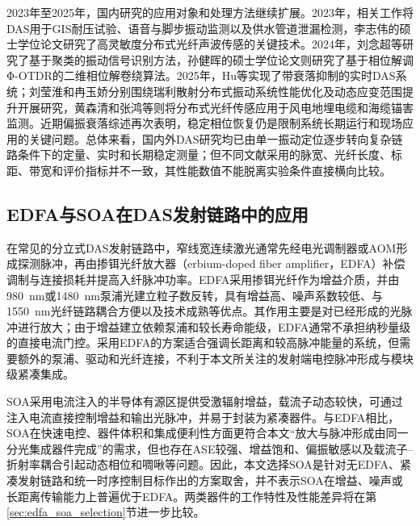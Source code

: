 2023年至2025年，国内研究的应用对象和处理方法继续扩展。2023年，相关工作将DAS用于GIS耐压试验、语音与脚步振动监测以及供水管道泄漏检测\cite{huang2023gis_cn,sun2023voice_cn,zhang2023pipeline_thesis}，李志伟的硕士学位论文研究了高灵敏度分布式光纤声波传感的关键技术\cite{li2023highsensitivity_thesis}。2024年，刘念超等研究了基于聚类的振动信号识别方法\cite{liu2024clustering_cn}，孙健晖的硕士学位论文则研究了基于相位解调Φ-OTDR的二维相位解卷绕算法\cite{sun2024unwrapping_thesis}。2025年，Hu等实现了带衰落抑制的实时DAS系统\cite{hu2025realtime}；刘莹淮和冉玉娇分别围绕瑞利散射分布式振动系统性能优化及动态应变范围提升开展研究\cite{liu2025rayleigh_thesis,ran2025dynamic_thesis}，黄森清和张鸿等则将分布式光纤传感应用于风电地埋电缆和海缆锚害监测\cite{huang2025cable_thesis,zhang2025submarine_cn}。近期偏振衰落综述再次表明，稳定相位恢复仍是限制系统长期运行和现场应用的关键问题\cite{lei2025fading_cn}。总体来看，国内外DAS研究均已由单一振动定位逐步转向复杂链路条件下的定量、实时和长期稳定测量；但不同文献采用的脉宽、光纤长度、标距、带宽和评价指标并不一致，其性能数值不能脱离实验条件直接横向比较。

\subsection{EDFA与SOA在DAS发射链路中的应用}

在常见的分立式DAS发射链路中，窄线宽连续激光通常先经电光调制器或AOM形成探测脉冲，再由掺铒光纤放大器（erbium-doped fiber amplifier，EDFA）补偿调制与连接损耗并提高入纤脉冲功率。EDFA采用掺铒光纤作为增益介质，并由980~nm或1480~nm泵浦光建立粒子数反转，具有增益高、噪声系数较低、与1550~nm光纤链路耦合方便以及技术成熟等优点\cite{giles1991edfa,muanenda2018advances,wang2020recent}。其作用主要是对已经形成的光脉冲进行放大；由于增益建立依赖泵浦和较长寿命能级，EDFA通常不承担纳秒量级的直接电流门控。采用EDFA的方案适合强调长距离和较高脉冲能量的系统，但需要额外的泵浦、驱动和光纤连接，不利于本文所关注的发射端电控脉冲形成与模块级紧凑集成。

SOA采用电流注入的半导体有源区提供受激辐射增益，载流子动态较快，可通过注入电流直接控制增益和输出光脉冲，并易于封装为紧凑器件\cite{sobhanan2022soa}。与EDFA相比，SOA在快速电控、器件体积和集成便利性方面更符合本文“放大与脉冲形成由同一分光集成器件完成”的需求，但也存在ASE较强、增益饱和、偏振敏感以及载流子--折射率耦合引起动态相位和啁啾等问题。因此，本文选择SOA是针对无EDFA、紧凑发射链路和统一时序控制目标作出的方案取舍，并不表示SOA在增益、噪声或长距离传输能力上普遍优于EDFA。两类器件的工作特性及性能差异将在第\ref{sec:edfa_soa_selection}节进一步比较。

